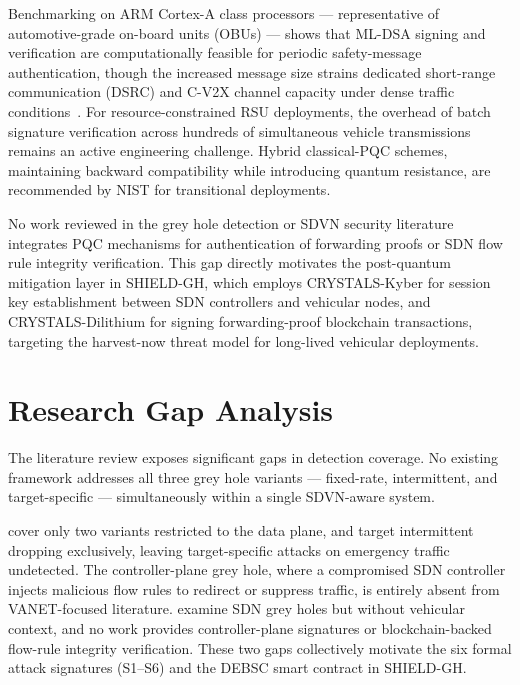 \documentclass[12pt, a4paper]{report}
\begin{document}
Benchmarking on ARM Cortex-A class processors — representative of
automotive-grade on-board units (OBUs) — shows that ML-DSA signing and
verification are computationally feasible for periodic safety-message
authentication, though the increased message size strains dedicated
short-range communication (DSRC) and C-V2X channel capacity under dense
traffic conditions~\cite{nist2024fips204}. For resource-constrained RSU
deployments, the overhead of batch signature verification across
hundreds of simultaneous vehicle transmissions remains an active
engineering challenge. Hybrid classical-PQC schemes, maintaining
backward compatibility while introducing quantum resistance, are
recommended by NIST for transitional deployments.

No work reviewed in the grey hole detection or SDVN security literature
integrates PQC mechanisms for authentication of forwarding proofs or
SDN flow rule integrity verification. This gap directly motivates the
post-quantum mitigation layer in SHIELD-GH, which employs
CRYSTALS-Kyber for session key establishment between SDN controllers
and vehicular nodes, and CRYSTALS-Dilithium for signing forwarding-proof
blockchain transactions, targeting the harvest-now threat model for
long-lived vehicular deployments.

\section{Research Gap Analysis}
\label{sec:gaps}

The literature review exposes significant gaps in detection coverage.
No existing framework addresses all three grey hole variants — fixed-rate,
intermittent, and target-specific — simultaneously within a single
SDVN-aware system.

\cite{malik2023greyhole} cover only two variants restricted to the data
plane, and \cite{remyakrishnan2022dtw} target intermittent dropping
exclusively, leaving target-specific attacks on emergency traffic
undetected.
The controller-plane grey hole, where a compromised SDN controller injects
malicious flow rules to redirect or suppress traffic, is entirely absent
from VANET-focused literature.
\cite{hsieh2018sdn} examine SDN grey holes but without vehicular context,
and no work provides controller-plane signatures or blockchain-backed
flow-rule integrity verification.
These two gaps collectively motivate the six formal attack signatures
(S1--S6) and the DEBSC smart contract in SHIELD-GH\@.
\end{document}
